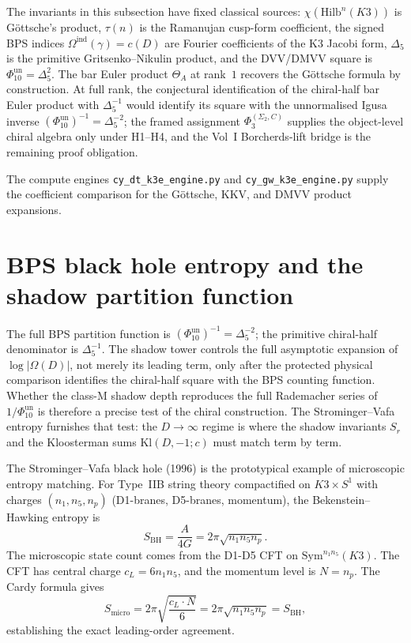 The invariants in this subsection have fixed classical sources:
\(\chi(\mathrm{Hilb}^n(K3))\) is G\"ottsche's product, \(\tau(n)\) is the
Ramanujan cusp-form coefficient, the signed BPS indices
\(\Omega^{\mathrm{ind}}(\gamma)=c(D)\) are Fourier coefficients of the K3 Jacobi
form, \(\Delta_5\) is the primitive Gritsenko--Nikulin product, and the
DVV/DMVV square is \(\Phi_{10}^{\mathrm{un}}=\Delta_5^2\). The bar Euler
product $\Theta_A$ at rank~$1$ recovers the G\"ottsche formula by
construction. At full rank, the conjectural identification of the
chiral-half bar Euler product with \(\Delta_5^{-1}\) would identify its
square with the unnormalised Igusa inverse
\((\Phi_{10}^{\mathrm{un}})^{-1}=\Delta_5^{-2}\); the framed assignment
\(\Phi_3^{(\Sigma_2,C)}\) supplies the object-level chiral algebra only
under H1--H4, and the Vol~I Borcherds-lift bridge is the remaining
proof obligation.

The compute engines \texttt{cy\_dt\_k3e\_engine.py} and
\texttt{cy\_gw\_k3e\_engine.py} supply the coefficient comparison for
the G\"ottsche, KKV, and DMVV product expansions.

\section{BPS black hole entropy and the shadow partition function}
\label{sec:k3e-bps-entropy}

The full BPS partition function is \((\Phi_{10}^{\mathrm{un}})^{-1}=\Delta_5^{-2}\); the primitive chiral-half denominator is \(\Delta_5^{-1}\). The shadow tower controls the full asymptotic expansion of \(\log|\Omega(D)|\), not merely its leading term, only after the protected physical comparison identifies the chiral-half square with the BPS counting function. Whether the class-M shadow depth reproduces the full Rademacher series of \(1/\Phi_{10}^{\mathrm{un}}\) is therefore a precise test of the chiral construction. The Strominger--Vafa entropy furnishes that test: the \(D \to \infty\) regime is where the shadow invariants \(S_r\) and the Kloosterman sums \(\mathrm{Kl}(D, -1; c)\) must match term by term.

The Strominger--Vafa black hole (1996) is the prototypical example of microscopic entropy matching.
For Type~IIB string theory compactified on $K3 \times S^1$ with charges $(n_1, n_5, n_p)$ (D1-branes, D5-branes, momentum), the Bekenstein--Hawking entropy is
\begin{equation}
\label{eq:k3e-strominger-vafa}
 S_{\mathrm{BH}} = \frac{A}{4G} = 2\pi\sqrt{n_1 n_5 n_p}.
\end{equation}
The microscopic state count comes from the D1-D5 CFT on $\mathrm{Sym}^{n_1 n_5}(K3)$. The CFT has central charge $c_L = 6 n_1 n_5$, and the momentum level is $N = n_p$. The Cardy formula gives
\begin{equation}
\label{eq:k3e-cardy}
 S_{\mathrm{micro}} = 2\pi\sqrt{\frac{c_L \cdot N}{6}} = 2\pi\sqrt{n_1 n_5 n_p} = S_{\mathrm{BH}},
\end{equation}
establishing the exact leading-order agreement.

